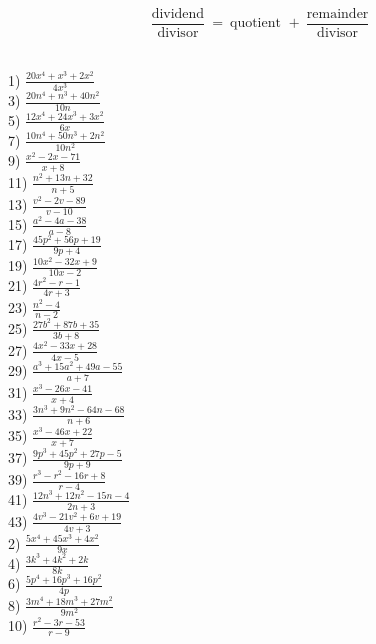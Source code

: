 {}
$$\frac{\text{dividend}}{\text{divisor}}~=~\text{quotient~}+~\frac{\text{remainder}}{\text{divisor}}$$
\\
\begin{multicols}{2}
  1) $\frac{20 x^4 + x^3 + 2 x^2}{4 x^3}$\\
  3) $\frac{20 n^4_{} + n^3_{} + 40 n^2}{10 n}$\\
  5) $\frac{12 x^4 + 24 x^3 + 3 x^2}{6 x}$\\
  7) $\frac{10 n^4 + 50 n^3 + 2 n^2}{10 n^2}$\\
  9) $\frac{x^2 - 2 x - 71}{x + 8}$\\
  11) $\frac{n^2 + 13 n + 32}{n + 5}$\\
  13) $\frac{v^2 - 2 v - 89}{v - 10}$\\
  15) $\frac{a^2 - 4 a - 38}{a - 8}$\\
  17) $\frac{45 p^2 + 56 p + 19}{9 p + 4}$\\
  19) $\frac{10 x^2 - 32 x + 9}{10 x - 2}$\\
  21) $\frac{4 r^2 - r - 1}{4 r + 3}$\\
  23) $\frac{n^2 - 4}{n - 2}$\\
  25) $\frac{27 b^2 + 87 b + 35}{3 b + 8}$\\
  27) $\frac{4 x^2 - 33 x + 28}{4 x - 5}$\\
  29) $\frac{a^3 + 15 a^2 + 49 a - 55}{a + 7}$\\
  31) $\frac{x^3 - 26 x - 41}{x + 4}$\\
  33) $\frac{3 n^3 + 9 n^2 - 64 n - 68}{n + 6}$\\
  35) $\frac{x^3 - 46 x + 22}{x + 7}$\\
  37) $\frac{9 p^3 + 45 p^2 + 27 p - 5}{9 p + 9}$\\
  39) $\frac{r^3 - r^2 - 16 r + 8}{r - 4}$\\
  41) $\frac{12 n^3 + 12 n^2 - 15 n - 4}{2 n + 3}$\\
  43) $\frac{4 v^3 - 21 v^2 + 6 v + 19}{4 v + 3}$\\  
  2) $\frac{5 x^4 + 45 x^3 + 4 x^2}{9 x}$\\
  4) $\frac{3 k^3 + 4 k^2 + 2 k}{8 k}$\\
  6) $\frac{5 p^4 + 16 p^3 + 16 p^2}{4 p}$\\
  8) $\frac{3 m^4 + 18 m^3 + 27 m^2}{9 m^2}$\\
  10) $\frac{r^2 - 3 r - 53}{r - 9}$\\

\end{multicols}
